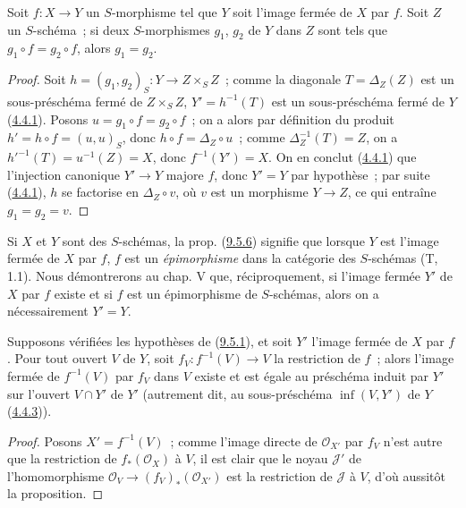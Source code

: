 \begin{corollary}[9.5.6]
\label{I.9.5.6-fr}
Soit $f:X\to Y$ un $S$-morphisme tel que $Y$ soit l'image fermée de $X$ par
$f$. Soit $Z$ un $S$-schéma~; si deux $S$-morphismes $g_1$, $g_2$ de $Y$
dans $Z$ sont tels que $g_1\circ f=g_2\circ f$, alors $g_1=g_2$.
\end{corollary}

\begin{proof}
Soit $h=(g_1,g_2)_S:Y\to Z\times_S Z$~; comme la diagonale
$T=\Delta_Z(Z)$ est un sous-préschéma fermé de $Z\times_S Z$,
$Y'=h^{-1}(T)$ est un sous-préschéma fermé de $Y$
(\hyperref[I.4.4.1-fr]{4.4.1}). Posons $u=g_1\circ f=g_2\circ f$~; on a
alors par définition du produit $h'=h\circ f=(u,u)_S$, donc
$h\circ f=\Delta_Z\circ u$~; comme $\Delta_Z^{-1}(T)=Z$, on a
$h'^{-1}(T)=u^{-1}(Z)=X$, donc $f^{-1}(Y')=X$. On en conclut
(\hyperref[I.4.4.1-fr]{4.4.1}) que l'injection canonique $Y'\to Y$ majore
$f$, donc $Y'=Y$ par hypothèse~; par suite
(\hyperref[I.4.4.1-fr]{4.4.1}), $h$ se factorise en $\Delta_Z\circ v$, où
$v$ est un morphisme $Y\to Z$, ce qui entraîne $g_1=g_2=v$.
\end{proof}

\begin{remark}[9.5.7]
\label{I.9.5.7-fr}
Si $X$ et $Y$ sont des $S$-schémas, la prop.
(\hyperref[I.9.5.6-fr]{9.5.6}) signifie que
lorsque $Y$ est l'image fermée de $X$ par $f$, $f$ est un
\emph{épimorphisme} dans la catégorie des $S$-schémas (T, 1.1). Nous
démontrerons au chap. V que, réciproquement, si l'image fermée $Y'$ de $X$
par $f$ existe et si $f$ est un épimorphisme de $S$-schémas, alors on a
nécessairement $Y'=Y$.
\end{remark}

\begin{proposition}[9.5.8]
\label{I.9.5.8-fr}
Supposons vérifiées les hypothèses de (\hyperref[I.9.5.1-fr]{9.5.1}), et
soit $Y'$ l'image fermée de $X$ par $f$. Pour tout ouvert $V$ de $Y$, soit
$f_V:f^{-1}(V)\to V$ la restriction de $f$~; alors l'image fermée de
$f^{-1}(V)$ par $f_V$ dans $V$ existe et est égale au préschéma induit par
$Y'$ sur l'ouvert $V\cap Y'$ de $Y'$ (autrement dit, au sous-préschéma
$\inf(V,Y')$ de $Y$ (\hyperref[I.4.4.3-fr]{4.4.3})).
\end{proposition}

\begin{proof}
Posons $X'=f^{-1}(V)$~; comme l'image directe de $\mathscr{O}_{X'}$ par
$f_V$ n'est autre que la restriction de $f_*(\mathscr{O}_X)$ à $V$, il est
clair que le noyau $\mathscr{J}'$ de l'homomorphisme
$\mathscr{O}_V\to(f_V)_*(\mathscr{O}_{X'})$ est la restriction de
$\mathscr{J}$ à $V$, d'où aussitôt la proposition.
\end{proof}

